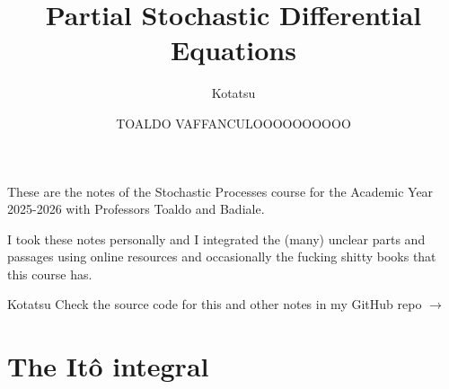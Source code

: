 \documentclass[12pt]{report}
\begin{document}
	\title{Partial Stochastic Differential Equations}
	\author{Kotatsu}
	\date{\small TOALDO VAFFANCULOOOOOOOOOO}
	\maketitle
	\begin{preface}
		These are the notes of the Stochastic Processes course for the Academic Year 2025-2026 with Professors Toaldo and Badiale.\par
		I took these notes personally and I integrated the (many) unclear parts and passages using online resources and occasionally the fucking shitty books that this course has. \par
		\vskip1.2cm
		
		\hfill Kotatsu
		\vskip1.2cm
		Check the source code for this and other notes in my GitHub repo $\to$ \href{https://github.com/godblessourdeadkotatsu/lecture-notes-2024-25/tree/main/PSDE}{\faGithubSquare}
	\end{preface}
	\clearpage
	\tableofcontents
\chapter{The Itô integral}	
\end{document}
